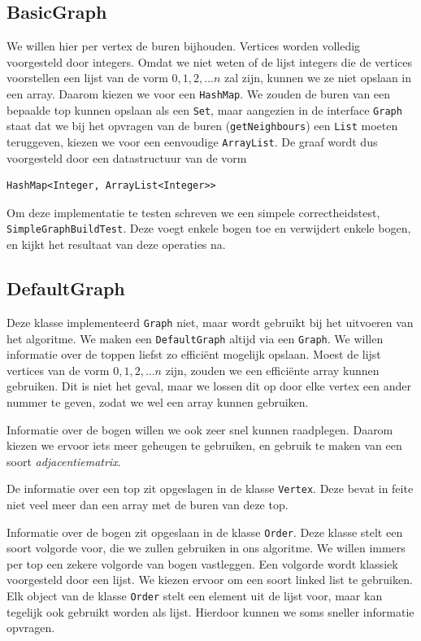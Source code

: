 \documentclass{article}
\begin{document}
\subsection{BasicGraph}
We willen hier per vertex de buren bijhouden. Vertices worden volledig
voorgesteld door integers. Omdat we niet weten of de lijst integers die de
vertices voorstellen een lijst van de vorm $0, 1, 2, \dots n$ zal zijn,
kunnen we ze niet opslaan in een array. Daarom kiezen we voor een
\verb#HashMap#. We zouden de buren van een bepaalde top kunnen opslaan als een
\verb#Set#, maar aangezien in de interface \verb#Graph# staat dat we bij het
opvragen van de buren (\verb#getNeighbours#) een \verb#List# moeten teruggeven,
kiezen we voor een eenvoudige \verb#ArrayList#. De graaf wordt dus voorgesteld
door een datastructuur van de vorm
\begin{verbatim}
HashMap<Integer, ArrayList<Integer>>
\end{verbatim}

Om deze implementatie te testen schreven we een simpele correctheidstest,
\verb#SimpleGraphBuildTest#. Deze voegt enkele bogen toe en verwijdert enkele
bogen, en kijkt het resultaat van deze operaties na.

\subsection{DefaultGraph}
Deze klasse implementeerd \verb#Graph# niet, maar wordt gebruikt bij het
uitvoeren van het algoritme. We maken een \verb#DefaultGraph# altijd via een
\verb#Graph#. We willen informatie over de toppen liefst zo effici\"ent mogelijk
opslaan. Moest de lijst vertices van de vorm $0, 1, 2, \dots n$ zijn, zouden we
een effici\"ente array kunnen gebruiken. Dit is niet het geval, maar we lossen
dit op door elke vertex een ander nummer te geven, zodat we wel een array kunnen
gebruiken.
\newline

Informatie over de bogen willen we ook zeer snel kunnen raadplegen. Daarom
kiezen we ervoor iets meer geheugen te gebruiken, en gebruik te maken van een
soort \emph{adjacentiematrix}.
\newline

De informatie over een top zit opgeslagen in de klasse \verb#Vertex#. Deze bevat
in feite niet veel meer dan een array met de buren van deze top.
\newline

Informatie over de bogen zit opgeslaan in de klasse \verb#Order#. Deze klasse
stelt een soort volgorde voor, die we zullen gebruiken in ons algoritme. We
willen immers per top een zekere volgorde van bogen vastleggen. Een volgorde
wordt klassiek voorgesteld door een lijst. We kiezen ervoor om een soort linked
list te gebruiken. Elk object van de klasse \verb#Order# stelt een element uit
de lijst voor, maar kan tegelijk ook gebruikt worden als lijst. Hierdoor kunnen
we soms sneller informatie opvragen.
\end{document}
